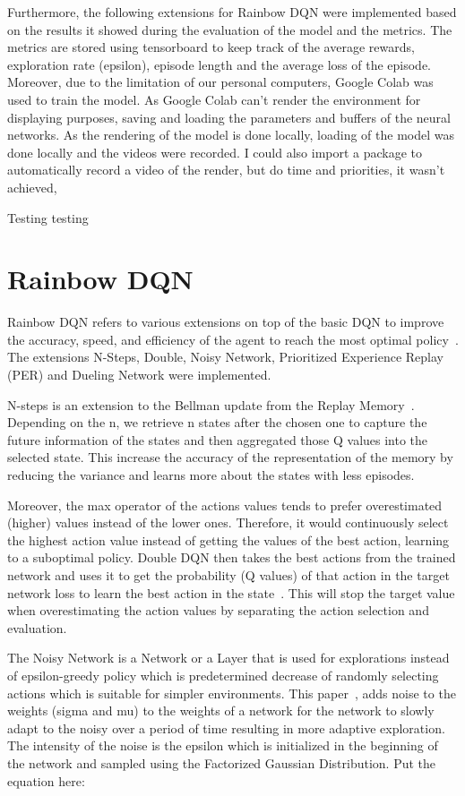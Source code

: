 \documentclass{article}
\begin{document}
Furthermore, the following extensions for Rainbow DQN were implemented based on the results it showed during the evaluation of the model and the metrics.
The metrics are stored using tensorboard to keep track of the average rewards, exploration rate (epsilon), episode length and the average loss of the episode.
Moreover, due to the limitation of our personal computers, Google Colab was used to train the model.
As Google Colab can't render the environment for displaying purposes, saving and loading the parameters and buffers of the neural networks.
As the rendering of the model is done locally, loading of the model was done locally and the videos were recorded.
I could also import a package to automatically record a video of the render, but do time and priorities, it wasn't achieved,

Testing testing

\section{Rainbow DQN}
Rainbow DQN refers to various extensions on top of the basic DQN to improve the accuracy, speed,  and efficiency of the agent to reach the most optimal policy~\cite{hessel_rainbow_2017}.
The extensions N-Steps, Double, Noisy Network, Prioritized Experience Replay (PER) and Dueling Network were implemented.

N-steps is an extension to the Bellman update from the Replay Memory~\cite{hernandez-garcia_understanding_2019}.
Depending on the n, we retrieve n states after the chosen one to capture the future information of the states and then aggregated those Q values into the selected state.
This increase the accuracy of the representation of the memory by reducing the variance and learns more about the states with less episodes.

Moreover, the max operator of the actions values tends to prefer overestimated (higher) values instead of the lower ones.
Therefore, it would continuously select the highest action value instead of getting the values of the best action, learning to a suboptimal policy.
Double DQN then takes the best actions from the trained network and uses it to get the probability (Q values) of that action in the target network loss to learn the best action in the state~\cite{hasselt_deep_2015}.
This will stop the target value when overestimating the action values by separating the action selection and evaluation.

The Noisy Network is a Network or a Layer that is used for explorations instead of epsilon-greedy policy which is predetermined decrease of randomly selecting actions which is suitable for simpler environments.
This paper~\cite{fortunato_noisy_2019}, adds noise to the weights (sigma and mu) to the weights of a network for the network to slowly adapt to the noisy over a period of time resulting in more adaptive exploration.
The intensity of the noise is the epsilon which is initialized in the beginning of the network and sampled using the Factorized Gaussian Distribution.
Put the equation here:
\end{document}
